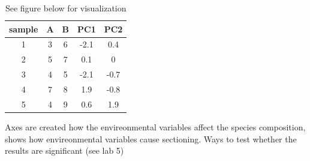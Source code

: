\documentclass{article}
\begin{document}
\begin{table}[h]
    \centering
    \begin{tabular}{c|c|c|c|c}
         sample & A & B & PC1 & PC2 \\
         \hline 
         1 & 3 & 6 & -2.1 & 0.4 \\
         \hline
         2 & 5 & 7 & 0.1 & 0  \\
         \hline
         3 & 4 & 5 & -2.1 & -0.7 \\
         \hline
         4 & 7 & 8 & 1.9 & -0.8 \\
         \hline
         5 & 4 & 9 & 0.6 & 1.9 \\
    \end{tabular}
    \caption{See figure below for visualization}
\end{table}
Axes are created how the envireonmental variables affect the species composition, shows how envireonmental variables cause sectioning. Ways to test whether the results are significant (see lab 5)\par 
\end{document}
